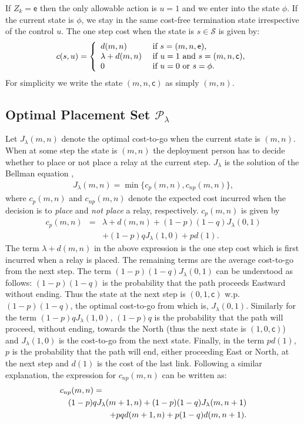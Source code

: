 \documentclass[conference]{IEEEtran}
\begin{document}
If $Z_k=\mathsf{e}$ then the only allowable action is $u=1$ and we
enter into the state $\phi$. If the current state is $\phi$, we stay
in the same cost-free termination state irrespective of the control
$u$. The one step cost when the state is $s\in\mathcal{S}$ is given
by:
\begin{eqnarray*}
c(s,u)=\left\{ \begin{array}{l l}
		d(m,n) & \mbox{ if } s=(m,n,\mathsf{e}),\\
		\lambda+d(m,n) & \mbox{ if } u=1 \mbox{ and } s=(m,n,\mathsf{c}), \\
		0 & \mbox{ if } u=0 \mbox{ or } s=\phi . \end{array}\right.		
\end{eqnarray*}
For simplicity we write the state $(m,n,\mathsf{c})$ as simply $(m,n)$.

\subsection{Optimal Placement Set $\mathcal{P}_\lambda$}
\label{nlos_relaxed_problem_section}
Let $J_{\lambda}(m,n)$ denote the optimal cost-to-go when the current
state is $(m,n)$. When at some step the state is $(m,n)$ the
deployment person has to decide whether to place or not place a relay
at the current step.  $J_\lambda$ is the solution of the Bellman
equation \cite[Page~137, Prop.~1.1]{Bertsekas2},
\begin{eqnarray}
J_{\lambda}(m,n)=\min\{c_p(m,n),c_{np}(m,n)\},
\end{eqnarray}
where $c_p(m,n)$ and $c_{np}(m,n)$ denote the expected cost incurred when the decision
is to \emph{place} and \emph{not place} a relay, respectively. $c_p(m,n)$ is given by
\begin{eqnarray} \label{cp}
c_p(m,n)&=&\lambda+d(m,n)+(1-p)(1-q)J_{\lambda}(0,1)\nonumber \\
&&+(1-p)qJ_{\lambda}(1,0)+pd(1).
\end{eqnarray}
The term $\lambda+d(m,n)$ in the above expression is the one step cost which is first 
incurred when a relay is placed. The remaining terms are the average cost-to-go from 
the next step. The term $(1-p)(1-q)J_{\lambda}(0,1)$ can be understood as follows:
$(1-p)(1-q)$ is the probability that the path proceeds Eastward without ending. 
Thus the state at the next step is $(0,1,\mathsf{c})$ w.p.\ $(1-p)(1-q)$, the optimal
cost-to-go from which is, $J_{\lambda}(0,1)$. Similarly for the term $(1-p)qJ_{\lambda}(1,0)$, 
$(1-p)q$ is the probability that the path will proceed, without ending, towards the North
(thus the next state is $(1,0,\mathsf{c})$) and  $J_{\lambda}(1,0)$ is the 
cost-to-go from the next state. Finally, in the term $pd(1)$, $p$ is the probability
that the path will end, either proceeding East or North, at the next step and $d(1)$
is the cost of the last link.
Following a similar explanation, the expression for $c_{np}(m,n)$ can be written as:
\begin{eqnarray} \label{cnp}
\lefteqn{c_{np}(m,n)=}\nonumber\\
&&(1-p)qJ_{\lambda}(m+1,n)+(1-p)(1-q)J_{\lambda}(m,n+1) \nonumber\\
&&+pqd(m+1,n)+p(1-q)d(m,n+1).
\end{eqnarray}
\end{document}
